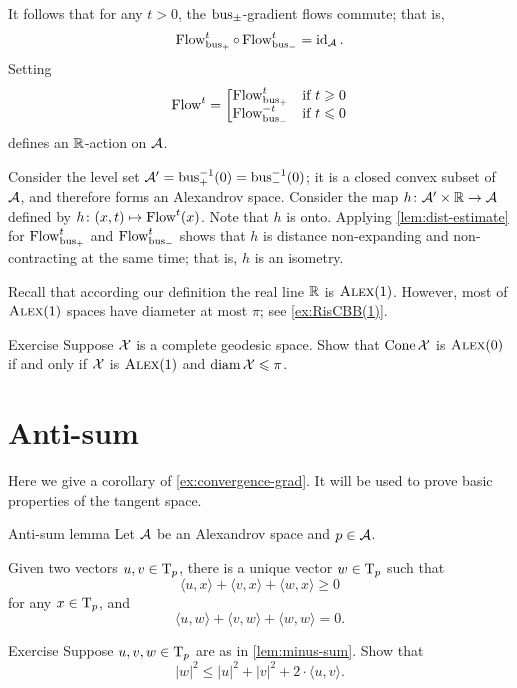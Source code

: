 It follows that for any $t>0$, the $\operatorname{\rm bus}\nolimits_\pm$-gradient flows commute;
that is, 
\[\mathop{\rm Flow}\nolimits_{\operatorname{\rm bus}\nolimits_+}^t\circ\mathop{\rm Flow}\nolimits_{\operatorname{\rm bus}\nolimits_-}^t=\operatorname{\rm id}\nolimits_{\mathcal{A}}.\]
Setting
\[\mathop{\rm Flow}\nolimits^t=\left[\begin{matrix}
\mathop{\rm Flow}\nolimits_{\operatorname{\rm bus}\nolimits_+}^t&\hbox{if}\ t\geqslant0\\
\mathop{\rm Flow}\nolimits_{\operatorname{\rm bus}\nolimits_-}^{-t}&\hbox{if}\ t\leqslant0
               \end{matrix}\right.\]
defines an $\mathbb{R}$-action on $\mathcal{A}$.

Consider the level set $\mathcal{A}'=\operatorname{\rm bus}\nolimits_+^{-1}(0)=\operatorname{\rm bus}\nolimits_-^{-1}(0)$;
it is a closed convex subset of $\mathcal{A}$, and therefore forms an Alexandrov space.
Consider the map $h\colon\mathcal{A}'\times \mathbb{R}\to \mathcal{A}$ defined by $h\colon(x,t)\mapsto \mathop{\rm Flow}\nolimits^t(x)$.
Note that $h$ is onto.
Applying \ref{lem:dist-estimate} for $\mathop{\rm Flow}\nolimits_{\operatorname{\rm bus}\nolimits_+}^t$ and $\mathop{\rm Flow}\nolimits_{\operatorname{\rm bus}\nolimits_-}^t$ shows that $h$ is distance non-expanding and non-contracting at the same time; that is, $h$ is an isometry.
\qeds

Recall that according our definition the real line $\mathbb{R}$ is $\textsc{Alex}(1)$.
However, most of $\textsc{Alex}(1)$ spaces have diameter at most $\pi$;
see \ref{ex:RisCBB(1)}.

\begin{thm}{Exercise}\label{ex:cone-CBB}
Suppose $\mathcal{X}$ is a complete geodesic space.
Show that $\mathop{\rm Cone}\nolimits\mathcal{X}$ is $\textsc{Alex}(0)$ if and only if $\mathcal{X}$ is $\textsc{Alex}(1)$ and $\operatorname{\rm diam}\nolimits\mathcal{X}\leqslant \pi$.
\end{thm}

\section{Anti-sum}

Here we give a corollary of \ref{ex:convergence-grad}.
It will be used to prove basic properties of the tangent space.


\begin{thm}{Anti-sum lemma}\label{lem:minus-sum} 
Let $\mathcal{A}$ be an Alexandrov space and $p\in \mathcal{A}$.

Given two vectors $u,v\in \mathrm{T}_p$, there is a unique vector $w\in \mathrm{T}_p$ such that
\[\langle u,x\rangle +\langle v,x\rangle +\langle w,x\rangle \ge 0\]
for any $x\in \mathrm{T}_p$, and
\[\langle u,w\rangle +\langle v,w\rangle +\langle w,w\rangle =0.\]

\end{thm}

\begin{thm}{Exercise}\label{ex:|antisum|}
Suppose $u,v, w\in \mathrm{T}_p$ are as in \ref{lem:minus-sum}.
Show that 
\[|w|^2\le |u|^2+|v|^2+2\cdot\langle u,v\rangle.\]

\end{thm}


